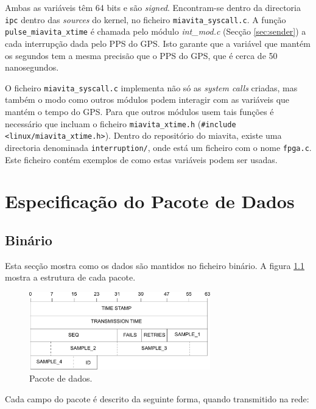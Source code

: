 \documentclass[10pt,a4paper,oneside]{book}
\begin{document}
Ambas as variáveis têm 64 bits e são \emph{signed}. Encontram-se dentro da directoria {\tt ipc} dentro das \emph{sources} do kernel, no ficheiro {\tt miavita\_syscall.c}. A função {\tt pulse\_miavita\_xtime} é chamada pelo módulo \emph{int\_mod.c} (Secção \ref{sec:sender}) a cada interrupção dada pelo PPS do GPS. Isto garante que a variável que mantém os segundos tem a mesma precisão que o PPS do GPS, que é cerca de 50 nanosegundos.

O ficheiro {\tt miavita\_syscall.c} implementa não só as \emph{system calls} criadas, mas também o modo como outros módulos podem interagir com as variáveis que mantém o tempo do GPS. Para que outros módulos usem tais funções é necessário que incluam o ficheiro {\tt miavita\_xtime.h} ({\tt \#include <linux/miavita\_xtime.h>}). Dentro do repositório do miavita, existe uma directoria denominada {\tt interruption/}, onde está um ficheiro com o nome {\tt fpga.c}. Este ficheiro contém exemplos de como estas variáveis podem ser usadas.

\chapter{Especificação do Pacote de Dados}\label{sec:packet_specification}

  \section{Binário}

	Esta secção mostra como os dados são mantidos no ficheiro binário. A figura \ref{fig:packet} mostra a estrutura de cada pacote.
	
	 \begin{figure}[h!]
   	  \centering
   	  \includegraphics[width=0.7\textwidth]{packet.pdf}
	  \caption{Pacote de dados.}
   	  \label{fig:packet}
 	\end{figure}

	Cada campo do pacote é descrito da seguinte forma, quando transmitido na rede:
\end{document}
